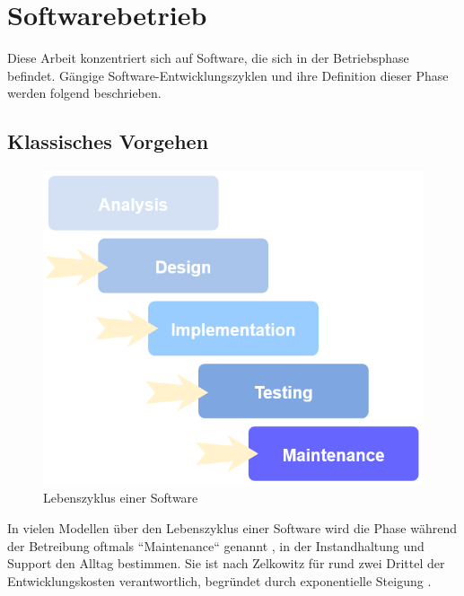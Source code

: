 
\section{Softwarebetrieb}

Diese Arbeit konzentriert sich auf Software, die sich in der Betriebsphase befindet. Gängige Software-Entwicklungszyklen und ihre Definition dieser Phase werden folgend beschrieben.

\subsection{Klassisches Vorgehen}

	\begin{figure}
		\centering
		\vspace{-\baselineskip}
		\includegraphics[width=\linewidth]{img/02_theorie/software-life-cycle.png}
		\caption{Lebenszyklus einer Software}
		\label{fig:software-development-life-cycle}
	\end{figure}
	
	In vielen Modellen über den Lebenszyklus einer Software wird die Phase während der Betreibung oftmals ``Maintenance`` genannt \cite{ManagingTheComplexityOfWebSystemsDevelopment} \cite{ASimulationModelWaterfallSoftware}, in der Instandhaltung und Support den Alltag bestimmen. Sie ist nach Zelkowitz \etal \cite{PrinciplesOfSoftwareEngineeringAndDesign} für rund zwei Drittel der Entwicklungskosten verantwortlich, begründet durch exponentielle Steigung \cite{ExtremeProgrammingExplained}.
	
